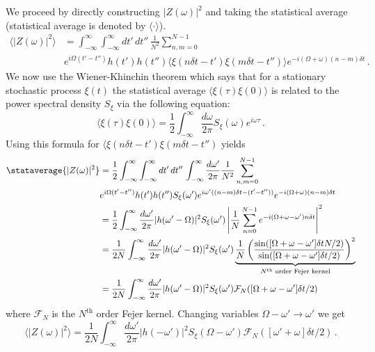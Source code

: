 We proceed by directly constructing $|Z(\omega)|^2$ and taking the statistical average (statistical average is denoted by $\langle \cdot \rangle$).
\begin{align}
\langle \left| Z(\omega) \right| ^2 \rangle
&= \int_{-\infty}^\infty \int_{-\infty}^\infty dt' \, dt'' \, \frac{1}{N^2} \sum_{n,m=0}^{N-1} \nonumber \\
& e^{i\Omega (t' - t'')} h(t') h(t'') \langle \xi(n\delta t - t') \xi(m\delta t - t'') \rangle e^{-i(\Omega + \omega)(n - m)\delta t} \, .
\end{align}
We now use the Wiener-Khinchin theorem which says that for a stationary stochastic process $\xi(t)$ the statistical average $\langle \xi(\tau) \xi(0) \rangle$  is related to the power spectral density $S_\xi$ via the following equation:
\begin{equation}
\langle \xi(\tau) \xi(0) \rangle = \frac{1}{2}\int_{-\infty}^\infty \frac{d\omega}{2\pi} S_\xi(\omega) e^{i \omega \tau} \, .
\end{equation}
Using this formula for $\langle \xi(n\delta t - t') \xi(m\delta t - t'')$ yields
\begin{align}
\stataverage{|Z(\omega)|^2}
&= \frac{1}{2} \int_{-\infty}^\infty \int_{-\infty}^\infty dt' \, dt'' \, \int_{-\infty}^\infty \frac{d\omega'}{2\pi}\frac{1}{N^2} \sum_{n,m=0}^{N-1} \nonumber \\
& e^{i\Omega (t' - t'')} h(t') h(t'') S_\xi(\omega') e^{i\omega' ((n-m)\delta t - (t' - t''))} e^{-i(\Omega + \omega)(n - m)\delta t} \\
&= \frac{1}{2} \int_{-\infty}^\infty \frac{d\omega'}{2\pi} |h(\omega' - \Omega)|^2 S_\xi(\omega') \left| \frac{1}{N} \sum_{n=0}^{N-1} e^{-i(\Omega + \omega - \omega') n \delta t} \right|^2 \\
&= \frac{1}{2N} \int_{-\infty}^\infty \frac{d\omega'}{2\pi} |h(\omega' - \Omega)|^2 S_\xi(\omega') \underbrace{
\frac{1}{N} \left( \frac{\sin([\Omega + \omega - \omega'] \delta t N / 2)}{\sin([\Omega + \omega - \omega']\delta t / 2)} \right)^2
}_{N^{\text{th}}\text{ order Fejer kernel}} \\
&= \frac{1}{2N} \int_{-\infty}^\infty \frac{d\omega'}{2\pi} |h(\omega' - \Omega)|^2 S_\xi(\omega') \mathcal{F}_N([\Omega + \omega - \omega'] \delta t / 2) \\
\end{align}
where $\mathcal{F}_N$ is the $N^{\text{th}}$ order Fejer kernel.
Changing variables $\Omega - \omega' \rightarrow \omega'$ we get
\begin{equation}
\langle |Z(\omega)|^2 \rangle =
\frac{1}{2N} \int_{-\infty}^\infty \frac{d\omega'}{2\pi} |h(-\omega')|^2 S_\xi(\Omega - \omega') \mathcal{F}_N([\omega' + \omega]\delta t / 2) \, .
\end{equation}
